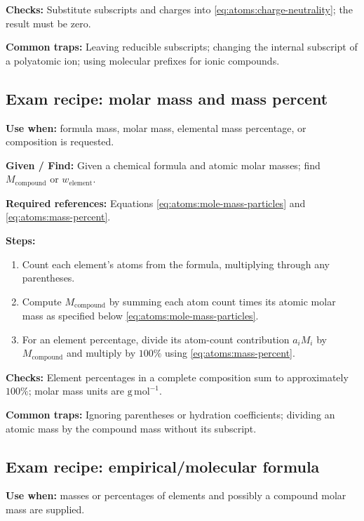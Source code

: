 \textbf{Checks:} Substitute subscripts and charges into \eqref{eq:atoms:charge-neutrality}; the result must be zero.

\textbf{Common traps:} Leaving reducible subscripts; changing the internal subscript of a polyatomic ion; using molecular prefixes for ionic compounds.

\subsection{Exam recipe: molar mass and mass percent}
\textbf{Use when:} formula mass, molar mass, elemental mass percentage, or composition is requested.

\textbf{Given / Find:} Given a chemical formula and atomic molar masses; find \(M_{\mathrm{compound}}\) or \(w_{\mathrm{element}}\).

\textbf{Required references:} Equations \eqref{eq:atoms:mole-mass-particles} and \eqref{eq:atoms:mass-percent}.


\textbf{Steps:}
\begin{enumerate}
    \item Count each element's atoms from the formula, multiplying through any parentheses.
    \item Compute \(M_{\mathrm{compound}}\) by summing each atom count times its atomic molar mass as specified below \eqref{eq:atoms:mole-mass-particles}.
    \item For an element percentage, divide its atom-count contribution \(a_iM_i\) by \(M_{\mathrm{compound}}\) and multiply by \(100\%\) using \eqref{eq:atoms:mass-percent}.
\end{enumerate}

\textbf{Checks:} Element percentages in a complete composition sum to approximately \(100\%\); molar mass units are \(\mathrm{g\,mol^{-1}}\).

\textbf{Common traps:} Ignoring parentheses or hydration coefficients; dividing an atomic mass by the compound mass without its subscript.

\subsection{Exam recipe: empirical/molecular formula}
\textbf{Use when:} masses or percentages of elements and possibly a compound molar mass are supplied.

